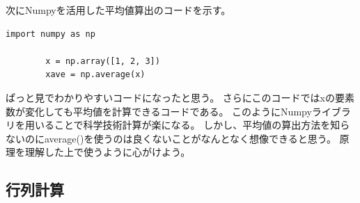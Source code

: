 \documentclass[]{article}
\begin{document}
	次にNumpyを活用した平均値算出のコードを示す。
	\begin{lstlisting}[caption=averagenumpy.py, label=avenumpy]
		import numpy as np

		x = np.array([1, 2, 3])
		xave = np.average(x)
	\end{lstlisting}
	ぱっと見でわかりやすいコードになったと思う。
	さらにこのコードではxの要素数が変化しても平均値を計算できるコードである。
	このようにNumpyライブラリを用いることで科学技術計算が楽になる。
	しかし、平均値の算出方法を知らないのにaverage()を使うのは良くないことがなんとなく想像できると思う。
	原理を理解した上で使うように心がけよう。

	\subsection{行列計算}


	


	
\end{document}
